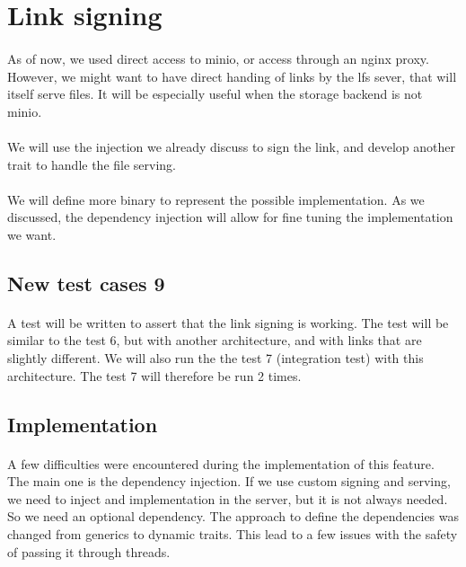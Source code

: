 \newpage
\section{Link signing}

\paragraph{}
As of now, we used direct access to minio, or access through an nginx proxy. However, we might want to have direct handing of links by the lfs sever, that will itself serve files. It will be especially useful when the storage backend is not minio. 

\paragraph{}
We will use the injection we already discuss to sign the link, and develop another trait to handle the file serving.

\paragraph{}
We will define more binary to represent the possible implementation. As we discussed, the dependency injection will allow for fine tuning the implementation we want. 


\subsection{New test cases 9}

\paragraph{}
A test will be written to assert that the link signing is working. The test will be similar to the test 6, but with another architecture, and with links that are slightly different. We will also run the the test 7 (integration test) with this architecture. The test 7 will therefore be run 2 times. 

\subsection{Implementation}

\paragraph{}
A few difficulties were encountered during the implementation of this feature. The main one is the dependency injection. If we use custom signing and serving, we need to inject and implementation in the server, but it is not always needed. So we need an optional dependency. The approach to define the dependencies was changed from generics to dynamic traits. This lead to a few issues with the safety of passing it through threads. 


